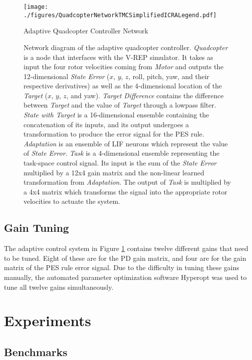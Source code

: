 \documentclass[letterpaper, 10 pt, conference]{ieeeconf}  %
\begin{document}
\begin{figure}
\centering
\texttt{[image: ./figures/QuadcopterNetworkTMCSimplifiedICRALegend.pdf]}
\caption{Adaptive Quadcopter Controller Network}
\label{fig:NetFinal}
\captionsetup{singlelinecheck=off,font=footnotesize}
\caption*{Network diagram of the adaptive quadcopter controller. \textit{Quadcopter} is a node that interfaces with the V-REP simulator. It takes as input the four rotor velocities coming from \textit{Motor} and outputs the 12-dimensional \textit{State Error} ($x$, $y$, $z$, roll, pitch, yaw, and their respective derivatives) as well as the 4-dimensional location of the \textit{Target} ($x$, $y$, $z$, and yaw). \textit{Target Difference} contains the difference between \textit{Target} and the value of \textit{Target} through a lowpass filter. \textit{State with Target} is a 16-dimensional ensemble containing the concatenation of its inputs, and its output undergoes a transformation to produce the error signal for the PES rule. \textit{Adaptation} is an ensemble of LIF neurons which represent the value of \textit{State Error}. \textit{Task} is a 4-dimensional ensemble representing the task-space control signal. Its input is the sum of the \textit{State Error} multiplied by a 12x4 gain matrix and the non-linear learned transformation from \textit{Adaptation}. The output of \textit{Task} is multiplied by a 4x4 matrix which transforms the signal into the appropriate rotor velocities to actuate the system.}
\end{figure}

\subsection{Gain Tuning}

The adaptive control system in Figure \ref{fig:NetFinal} contains twelve different gains that need to be tuned.
Eight of these are for the PD gain matrix, and four are for the gain matrix of the PES rule error signal.
Due to the difficulty in tuning these gains manually, the automated parameter optimization software Hyperopt \cite{bergstra2015hyperopt} was used to tune all twelve gains simultaneously.


\section{Experiments}

\subsection{Benchmarks}
\end{document}
